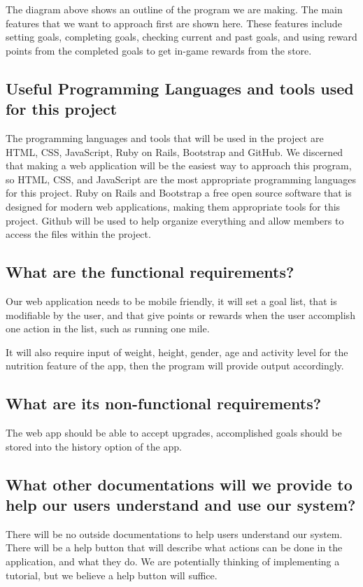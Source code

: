 \documentclass[a4paper]{article}
\begin{document}
\noindent The diagram above shows an outline of the program we are making.  The main features that we want to approach first are shown here.  These features include setting goals, completing goals, checking current and past goals, and using reward points from the completed goals to get in-game rewards from the store.


\subsection{Useful Programming Languages and tools used for this project}
The programming languages and tools that will be used in the project are HTML, CSS, JavaScript, Ruby on Rails, Bootstrap and GitHub.  We discerned that making a web application will be the easiest way to approach this program, so HTML, CSS, and JavaScript are the most appropriate programming languages for this project.  Ruby on Rails and Bootstrap a free open source software that is designed for modern web applications, making them appropriate tools for this project.  Github will be used to help organize everything and allow members to access the files within the project.

\subsection{What are the functional requirements?}
Our web application needs to be mobile friendly, it will set a goal list, that is modifiable by the user, and that give points or rewards when the user accomplish one action in the list, such as running one mile.\newline

\noindent It will also require input of weight, height, gender, age and activity level for the nutrition feature of the app, then the program will provide output accordingly.


\subsection{What are its non-functional requirements?}
The web app should be able to accept upgrades, accomplished goals should be stored into the history option of the app.


\subsection{What other documentations will we provide to help our users understand and use our system?}
There will be no outside documentations to help users understand our system.  There will be a help button that will describe what actions can be done in the application, and what they do.  We are potentially thinking of implementing a tutorial, but we believe a help button will suffice.
\end{document}
